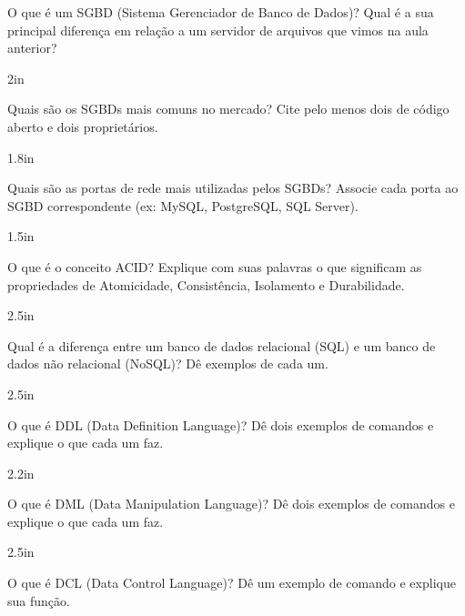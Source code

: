 \documentclass[12pt]{exam}
\begin{document}
	\noindent
\begin{questions}

\question O que é um SGBD (Sistema Gerenciador de Banco de Dados)? Qual é a sua principal diferença em relação a um servidor de arquivos que vimos na aula anterior?

\begin{solutionbox}{2in} \end{solutionbox}

\question Quais são os SGBDs mais comuns no mercado? Cite pelo menos dois de código aberto e dois proprietários.

\begin{solutionbox}{1.8in} \end{solutionbox}

\question Quais são as portas de rede mais utilizadas pelos SGBDs? Associe cada porta ao SGBD correspondente (ex: MySQL, PostgreSQL, SQL Server).

\begin{solutionbox}{1.5in} \end{solutionbox}

\question O que é o conceito ACID? Explique com suas palavras o que significam as propriedades de Atomicidade, Consistência, Isolamento e Durabilidade.

\begin{solutionbox}{2.5in} \end{solutionbox}

\question Qual é a diferença entre um banco de dados relacional (SQL) e um banco de dados não relacional (NoSQL)? Dê exemplos de cada um.

\begin{solutionbox}{2.5in} \end{solutionbox}

\question O que é DDL (Data Definition Language)? Dê dois exemplos de comandos e explique o que cada um faz.

\begin{solutionbox}{2.2in} \end{solutionbox}

\question O que é DML (Data Manipulation Language)? Dê dois exemplos de comandos e explique o que cada um faz.

\begin{solutionbox}{2.5in} \end{solutionbox}

\question O que é DCL (Data Control Language)? Dê um exemplo de comando e explique sua função.


\end{questions}
\end{document}
